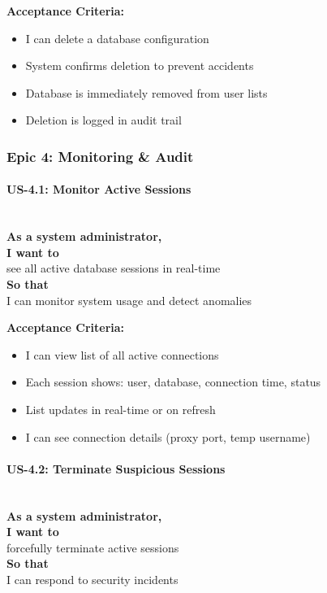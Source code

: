 \noindent\textbf{Acceptance Criteria:}
\begin{itemize}
    \item I can delete a database configuration
    \item System confirms deletion to prevent accidents
    \item Database is immediately removed from user lists
    \item Deletion is logged in audit trail
\end{itemize}

\subsubsection{Epic 4: Monitoring \& Audit}

\paragraph{US-4.1: Monitor Active Sessions}
\mbox{}\\[0.5em]

\noindent\textbf{As a system administrator,} \\
\textbf{I want to} \\
see all active database sessions in real-time \\
\textbf{So that} \\
I can monitor system usage and detect anomalies

\noindent\textbf{Acceptance Criteria:}
\begin{itemize}
    \item I can view list of all active connections
    \item Each session shows: user, database, connection time, status
    \item List updates in real-time or on refresh
    \item I can see connection details (proxy port, temp username)
\end{itemize}

\paragraph{US-4.2: Terminate Suspicious Sessions}
\mbox{}\\[0.5em]

\noindent\textbf{As a system administrator,} \\
\textbf{I want to} \\
forcefully terminate active sessions \\
\textbf{So that} \\
I can respond to security incidents

